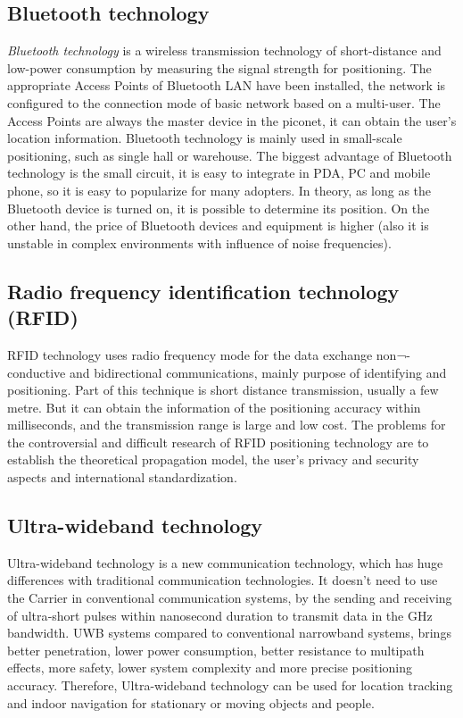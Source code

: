 \subsection{Bluetooth technology}

\textit{Bluetooth technology} is a wireless transmission technology of short-distance and low-power consumption by measuring the signal strength for positioning. The appropriate Access Points of Bluetooth LAN have been installed, the network is configured to the connection mode of basic network based on a multi-user. The Access Points are always the master device in the piconet, it can obtain the user's location information. Bluetooth technology is mainly used in small-scale positioning, such as single hall or warehouse. The biggest advantage of Bluetooth technology is the small circuit, it is easy to integrate in PDA, PC and mobile phone, so it is easy to popularize for many adopters. In theory, as long as the Bluetooth device is turned on, it is possible to determine its position. On the other hand, the price of Bluetooth devices and equipment is higher (also it is unstable in complex environments with influence of noise frequencies).    

\subsection{Radio frequency identification technology (RFID)}

RFID technology uses radio frequency mode for the data exchange non¬-conductive and bidirectional communications, mainly purpose of identifying and positioning. Part of this technique is short distance transmission, usually a few metre. But it can obtain the information of the positioning accuracy within milliseconds, and the transmission range is large and low cost. The problems for the controversial and difficult research of RFID positioning technology are to establish the theoretical propagation model, the user's privacy and security aspects and international standardization.   

\subsection{Ultra-wideband technology}

Ultra-wideband technology is a new communication technology, which has huge differences with traditional communication technologies. It doesn’t need to use the Carrier in conventional communication systems, by the sending and receiving of ultra‐short pulses within nanosecond duration to transmit data in the GHz bandwidth. UWB systems compared to conventional narrowband systems, brings better penetration, lower power consumption, better resistance to multipath effects, more safety, lower system complexity and more precise positioning accuracy. Therefore, Ultra-wideband technology can be used for location tracking and indoor navigation for stationary or moving objects and people.    

